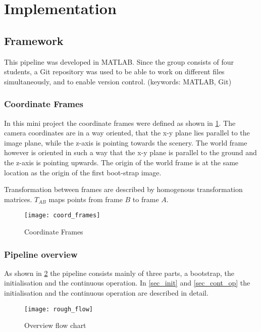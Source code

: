 \section{Implementation}

\subsection{Framework}
This pipeline was developed in MATLAB. Since the group consists of four students, a Git repository was used to be able to work on different files simultaneously, and to enable version control.
(keywords: MATLAB, Git)

\subsubsection{Coordinate Frames}
In this mini project the coordinate frames were defined as shown in \cref{img_coord_frames}. The camera coordinates are in a way oriented, that the x-y plane lies parallel to the image plane, while the z-axis is pointing towards the scenery. The world frame however is oriented in such a way that the x-y plane is parallel to the ground and the z-axis is pointing upwards. The origin of the world frame is at the same location as the origin of the first boot-strap image.


Transformation between frames are described by homogenous transformation matrices. $T_{AB}$ maps points from frame $B$ to frame $A$.

\begin{figure}[ht]
	\centering
	\texttt{[image: coord\_frames]}
	\caption{Coordinate Frames}
	\label{img_coord_frames}
\end{figure}

\subsubsection{Pipeline overview}

As shown in \cref{img_flow_rough} the pipeline consists mainly of three parts, a bootstrap, the initialisation and the continuous operation. In \cref{sec_init} and \cref{sec_cont_op} the initialisation and the continuous operation are described in detail.

\begin{figure}[ht]
	\centering
	\texttt{[image: rough\_flow]}
	\caption{Overview flow chart}
	\label{img_flow_rough}
\end{figure}

